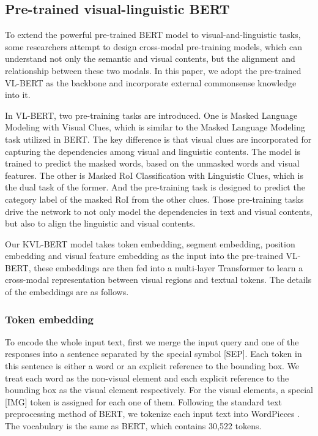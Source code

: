 \documentclass[conference]{IEEEtran}
\begin{document}
\subsection{Pre-trained visual-linguistic BERT}\label{D}
To extend the powerful pre-trained BERT model to visual-and-linguistic tasks, some researchers attempt to design cross-modal pre-training models, which can understand not only the semantic and visual contents, but the alignment and relationship between these two modals. In this paper, we adopt the pre-trained VL-BERT \cite{b14} as the backbone and incorporate external commonsense knowledge into it. 

In VL-BERT, two pre-training tasks are introduced. One is Masked Language Modeling with Visual Clues, which is similar to the Masked Language Modeling task utilized in BERT. The key difference is that visual clues are incorporated for capturing the dependencies among visual and linguistic contents. The model is trained to predict the masked words, based on the unmasked words and visual features. The other is Masked RoI Classification with Linguistic Clues, which is the dual task of the former. And the pre-training task is designed to predict the category label of the masked RoI from the other clues. Those pre-training tasks drive the network to not only model the dependencies in text and visual contents, but also to align the linguistic and visual contents.


Our KVL-BERT model takes token embedding, segment embedding, position embedding and visual feature embedding as the input into the pre-trained VL-BERT, these embeddings are then fed into a multi-layer Transformer to learn a cross-modal representation between visual regions and textual tokens. The details of the embeddings are as follows.


\subsubsection{Token embedding}
To encode the whole input text, first we merge the input query and one of the responses into a sentence separated by the special symbol [SEP]. Each token in this sentence is either a word or an explicit reference to the bounding box. We treat each word as the non-visual element and each explicit reference to the bounding box as the visual element respectively. For the visual elements, a special [IMG] token is assigned for each one of them. Following the standard text preprocessing method of BERT, we tokenize each input text into WordPieces \cite{b38}. The vocabulary is the same as BERT, which contains 30,522 tokens. 
\end{document}
